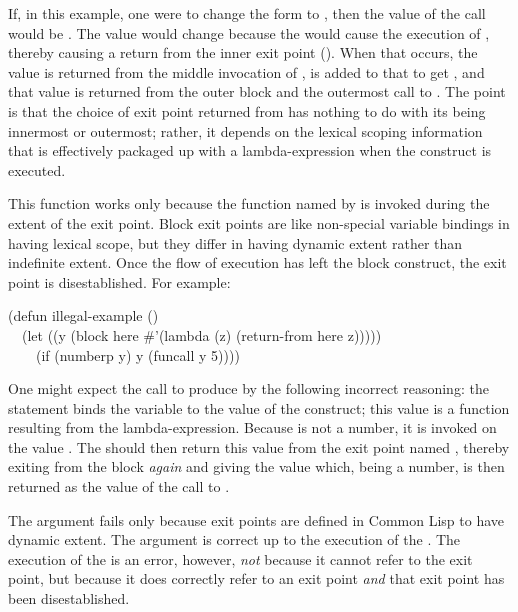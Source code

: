 If, in this example, one were to change the form  to
, then the value of the call 
would be .  The value would change because the  would cause the
execution of , thereby causing
a return from the inner exit point ().
When that occurs, the value  is returned from the
middle invocation of ,  is added to that
to get , and that value is returned from the outer block
and the outermost call to .  The point
is that the choice of exit point returned from has nothing to do with its
being innermost or outermost; rather,
it depends on the lexical scoping information
that is effectively packaged up with a lambda-expression when the
 construct is executed.

This function  works only because the
function named by  is invoked during the extent of the exit point.
Block exit points are like non-special variable bindings in having
lexical scope, but they differ in having dynamic extent rather than indefinite
extent.  Once the flow of execution has left the block construct,
the exit point is disestablished.  For example:
\begin{lisp}
(defun illegal-example () \\
~~(let ((y (block here \#'(lambda (z) (return-from here z))))) \\
~~~~(if (numberp y) y (funcall y 5))))
\end{lisp}
One might expect the call  to produce 
by the following incorrect reasoning:
the  statement binds the variable  to the
value of the  construct; this value is a function resulting
from the lambda-expression.  Because  is not a number, it is
invoked on the value .  The  should then
return this value from the exit point named , thereby
exiting from the block {\it again} and giving  the value 
which, being a number, is then returned as the value of the call
to .

The argument fails only because exit points are defined in Common Lisp
to have dynamic extent.  The argument is correct up to the execution
of the .  The execution of the  is
an error, however, {\it not} because it cannot refer to the exit point,
but because it does correctly refer to an exit point {\it and}
that exit point has been disestablished.
